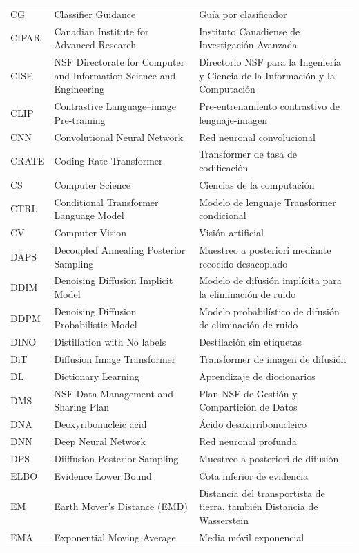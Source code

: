 \documentclass[../book-main_es.tex]{subfiles}
\begin{document}
\begin{longtable}{@{} p{} @{\hspace{1em}} p{} @{\hspace{1em}} p{}}
CG & Classifier Guidance & Guía por clasificador \\
CIFAR & Canadian Institute for Advanced Research & Instituto Canadiense de Investigación Avanzada \\
CISE & NSF Directorate for Computer and Information Science and Engineering & Directorio NSF para la Ingeniería y Ciencia de la Información y la Computación \\
CLIP & Contrastive Language–image Pre-training & Pre-entrenamiento contrastivo de lenguaje-imagen \\
CNN & Convolutional Neural Network & Red neuronal convolucional \\
CRATE & Coding Rate Transformer & Transformer de tasa de codificación \\
CS & Computer Science & Ciencias de la computación  \\
CTRL & Conditional Transformer Language Model & Modelo de lenguaje Transformer condicional \\
CV & Computer Vision & Visión artificial \\
DAPS & Decoupled Annealing Posterior Sampling & Muestreo a posteriori mediante recocido desacoplado \\
DDIM & Denoising Diffusion Implicit Model & Modelo de difusión implícita para la eliminación de ruido \\
DDPM & Denoising Diffusion Probabilistic Model & Modelo probabilístico de difusión de eliminación de ruido \\
DINO & Distillation with No labels & Destilación sin etiquetas \\
DiT & Diffusion Image Transformer & Transformer de imagen de difusión \\
DL & Dictionary Learning & Aprendizaje de diccionarios \\
DMS & NSF Data Management and Sharing Plan & Plan NSF de Gestión y Compartición de Datos \\
DNA & Deoxyribonucleic acid & Ácido desoxirribonucleico \\
DNN & Deep Neural Network & Red neuronal profunda \\
DPS & Diiffusion Posterior Sampling & Muestreo a posteriori de difusión \\
ELBO & Evidence Lower Bound & Cota inferior de evidencia \\
EM & Earth Mover’s Distance (EMD) & Distancia del transportista de tierra, también Distancia de Wasserstein \\
EMA & Exponential Moving Average & Media móvil exponencial \\

\end{longtable}
\end{document}

